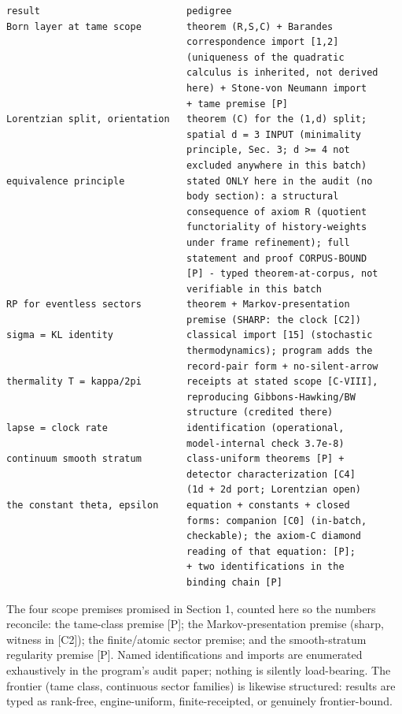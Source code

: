 \documentclass[11pt]{article}
\begin{document}
\begin{small}\begin{verbatim}
result                          pedigree
Born layer at tame scope        theorem (R,S,C) + Barandes
                                correspondence import [1,2]
                                (uniqueness of the quadratic
                                calculus is inherited, not derived
                                here) + Stone-von Neumann import
                                + tame premise [P]
Lorentzian split, orientation   theorem (C) for the (1,d) split;
                                spatial d = 3 INPUT (minimality
                                principle, Sec. 3; d >= 4 not
                                excluded anywhere in this batch)
equivalence principle           stated ONLY here in the audit (no
                                body section): a structural
                                consequence of axiom R (quotient
                                functoriality of history-weights
                                under frame refinement); full
                                statement and proof CORPUS-BOUND
                                [P] - typed theorem-at-corpus, not
                                verifiable in this batch
RP for eventless sectors        theorem + Markov-presentation
                                premise (SHARP: the clock [C2])
sigma = KL identity             classical import [15] (stochastic
                                thermodynamics); program adds the
                                record-pair form + no-silent-arrow
thermality T = kappa/2pi        receipts at stated scope [C-VIII],
                                reproducing Gibbons-Hawking/BW
                                structure (credited there)
lapse = clock rate              identification (operational,
                                model-internal check 3.7e-8)
continuum smooth stratum        class-uniform theorems [P] +
                                detector characterization [C4]
                                (1d + 2d port; Lorentzian open)
the constant theta, epsilon     equation + constants + closed
                                forms: companion [C0] (in-batch,
                                checkable); the axiom-C diamond
                                reading of that equation: [P];
                                + two identifications in the
                                binding chain [P]
\end{verbatim}\end{small}
The four scope premises promised in Section 1, counted here so the numbers reconcile: the tame-class premise [P]; the Markov-presentation premise (sharp, witness in [C2]); the finite/atomic sector premise; and the smooth-stratum regularity premise [P]. Named identifications and imports are enumerated exhaustively in the program's audit paper; nothing is silently load-bearing.  The frontier (tame class, continuous sector families) is likewise structured: results are typed as rank-free, engine-uniform, finite-receipted, or genuinely frontier-bound.
\end{document}
